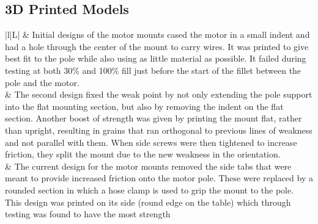 \subsection{3D Printed Models}
\label{sec:print}
\begin{table}[!htbp]
	\centering
	\caption{Modelling iterations for motor mounts}
	\begin{tabulary}{\textwidth}{|l|L|}
		\hline 
		\centering
		 &
		\vspace{40pt} Initial designs of the motor mounts cased the motor in a small indent and had a hole through the center of the mount to carry wires. It was printed to give best fit to the pole while also using as little material as possible.
		It failed during testing at both 30\% and 100\% fill just before the start of the fillet between the pole and the motor. \\ 
		\hline 
		\centering
		 &
		\vspace{40pt} The second design fixed the weak point by not only extending the pole support into the flat mounting section, but also by removing the indent on the flat section.
		Another boost of strength was given by printing the mount flat, rather than upright, resulting in grains that ran orthogonal to previous lines of weakness and not parallel with them.
		When side screws were then tightened to increase friction, they split the mount due to the new weakness in the orientation. \\ 
		\hline 
		\centering
		 &
		\vspace{40pt} The current design for the motor mounts removed the side tabs that were meant to provide increased friction onto the motor pole. These were replaced by a rounded section in which a hose clamp is used to grip the mount to the pole. This design was printed on its side (round edge on the table) which through testing was found to have the most strength\\ 
		\hline
	\end{tabulary} 
	\label{tab:3D_motor}
\end{table}

\newpage

